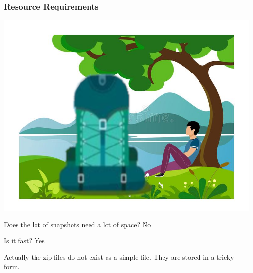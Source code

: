 \documentclass[aspectratio=169]{beamer}
\begin{document}
\begin{frame}
\frametitle<presentation>{Resource Requirements}
  
\noindent\begin{minipage}{0.6\textwidth}%
\includegraphics[width=\linewidth]{pictures/resting-under-tree+big_pack.png}
\end{minipage}%
\hfill%
\begin{minipage}{0.4\textwidth}\raggedleft

\begin{block}{Does the lot of snapshots need a lot of space?}
No
\end{block}


\begin{block}{Is it fast?}
Yes 
\end{block}

Actually the zip files do not exist as a simple file. They are stored in a tricky form.
	
\end{minipage}
  
\end{frame}
\end{document}

